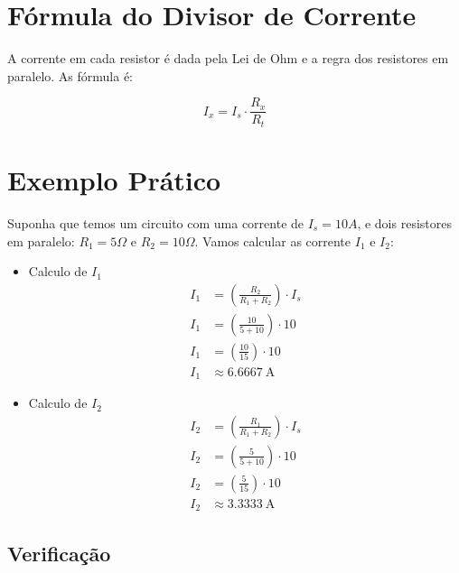 \documentclass{article}
\begin{document}
\section{Fórmula do Divisor de Corrente}

A corrente em cada resistor é dada pela Lei de Ohm e a regra dos resistores em paralelo. As fórmula é:

\begin{equation}
I_x = I_s \cdot \frac{R_x}{R_t}
\end{equation}

\section{Exemplo Prático}

Suponha que temos um circuito com uma corrente de $I_s = 10A$, e dois resistores em paralelo: $R_1 = 5 \Omega$ e $R_2 = 10 \Omega$. Vamos calcular as corrente $I_1$ e $I_2$:

\begin{itemize}
	\item Calculo de $I_1$
	\begin{equation}
	\begin{aligned}
	I_1 &= \left(\frac{R_2}{R_1 + R_2}\right) \cdot I_s \\
	I_1 &= \left(\frac{10}{5+10}\right) \cdot 10 \\
	I_1 &= \left(\frac{10}{15}\right) \cdot 10 \\
	I_1 &\approx \SI{6.6667}{\ampere}
	\end{aligned}
	\end{equation}
	
	\item Calculo de $I_2$
	\begin{equation}
	\begin{aligned}
	I_2 &= \left(\frac{R_1}{R_1 + R_2}\right) \cdot I_s \\
	I_2 &= \left(\frac{5}{5+10}\right) \cdot 10 \\
	I_2 &= \left(\frac{5}{15}\right) \cdot 10 \\
	I_2 &\approx \SI{3.3333}{\ampere}
	\end{aligned}
	\end{equation}
	
\end{itemize}

\subsection{Verificação}
\end{document}
